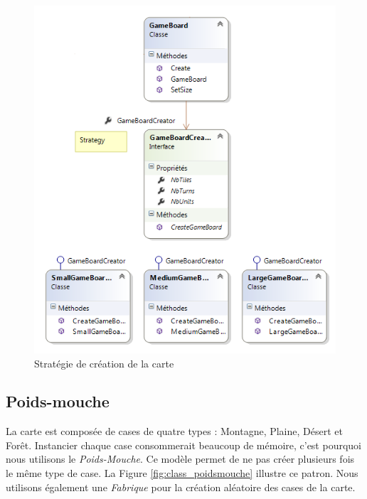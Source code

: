 \documentclass[a4paper]{article}
\begin{document}
\begin{figure}[ht]
\centering
	\includegraphics[width=\textwidth]{../Schemas/class_GameBoardBuilder_Strategy.png}
		\caption{Stratégie de création de la carte}
		\label{fig:class_strategy}
\end{figure}

\clearpage
	\subsection{Poids-mouche}
La carte est composée de cases de quatre types : Montagne, Plaine, Désert et Forêt. Instancier chaque case consommerait beaucoup de mémoire, c'est pourquoi nous utilisons le \textit{Poids-Mouche}. Ce modèle permet de ne pas créer plusieurs fois le même type de case. La Figure \ref{fig:class_poidsmouche} illustre ce patron. Nous utilisons également une \textit{Fabrique} pour la création aléatoire des cases de la carte.
\end{document}
